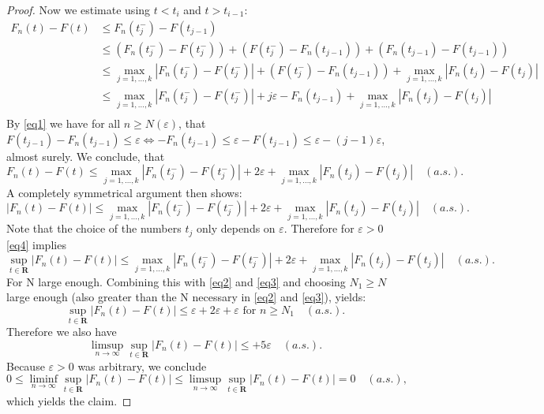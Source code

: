 \documentclass{article}
\begin{document}
\begin{proof}
Now we estimate using \(t < t_i\) and \(t> t_{i-1}\):
\begin{align*}
    F_n(t)-F(t) &\le F_n(t_j^-) -F(t_{j-1}) \\
                &\le (F_n(t_j^-) -F(t_j^-)) +(F(t_j^-)- F_n(t_{j-1})) +(F_n(t_{j-1})-F(t_{j-1}) ) \\
                &\le \max_{j=1,\ldots,k}|F_n(t_j^-) -F(t_j^-)| +(F(t_j^-)- F_n(t_{j-1})) + \max_{j=1,\ldots,k}|F_n(t_j)-F(t_j)|\\
                &\le \max_{j=1,\ldots,k}|F_n(t_j^-) -F(t_j^-)| +j\varepsilon- F_n(t_{j-1}) + \max_{j=1,\ldots,k}|F_n(t_j)-F(t_j)|\\
\end{align*} 
By \eqref{eq1} we have for all \(n \ge N(\varepsilon)\), that \(F(t_{j-1})-F_n(t_{j-1}) \le \varepsilon \iff -F_n(t_{j-1}) \le \varepsilon-F(t_{j-1}) \le \varepsilon - (j-1)\varepsilon  \), almost surely.
We conclude, that 
\[ 
    F_n(t)-F(t) \le \max_{j=1,\ldots,k}|F_n(t_j^-) -F(t_j^-)| +2\varepsilon + \max_{j=1,\ldots,k}|F_n(t_j)-F(t_j)| \quad (a.s.).
\]
A completely symmetrical argument then shows: 
\begin{equation}
    \label{eq4}
    |F_n(t)-F(t)| \le \max_{j=1,\ldots,k}|F_n(t_j^-) -F(t_j^-)| +2\varepsilon + \max_{j=1,\ldots,k}|F_n(t_j)-F(t_j)| \quad (a.s.).
\end{equation}
Note that the choice of the numbers \(t_j\) only depends on \(\varepsilon\).
Therefore for \(\varepsilon > 0\) \eqref{eq4} implies 
\[
    \sup_{t\in \mathbf{R}}|F_n(t)-F(t)| \le \max_{j=1,\ldots,k}|F_n(t_j^-) -F(t_j^-)| +2\varepsilon + \max_{j=1,\ldots,k}|F_n(t_j)-F(t_j)| \quad (a.s.).
\]
For N large enough. Combining this with \eqref{eq2} and \eqref{eq3} and choosing \(N_1 \ge N\) large enough (also greater than the N necessary in \eqref{eq2} and \eqref{eq3}), yields:
\[ 
    \sup_{t\in \mathbf{R}}|F_n(t)-F(t)| \le \varepsilon  +2\varepsilon + \varepsilon  \text{ for } n \ge N_1 \quad (a.s.).
    \]
    Therefore we also have
    \[ 
        \limsup_{n\to \infty}\sup_{t\in \mathbf{R}}|F_n(t)-F(t)| \le +5\varepsilon  \quad (a.s.).
    \]
    Because \(\varepsilon > 0 \)  was arbitrary, we conclude
    \[
    0 \le \liminf_{n\to \infty}\sup_{t\in \mathbf{R}}|F_n(t)-F(t)| \le \limsup_{n\to \infty}\sup_{t\in \mathbf{R}}|F_n(t)-F(t)|=0  \quad (a.s.),
    \]
    which yields the claim.
\end{proof}
\end{document}
